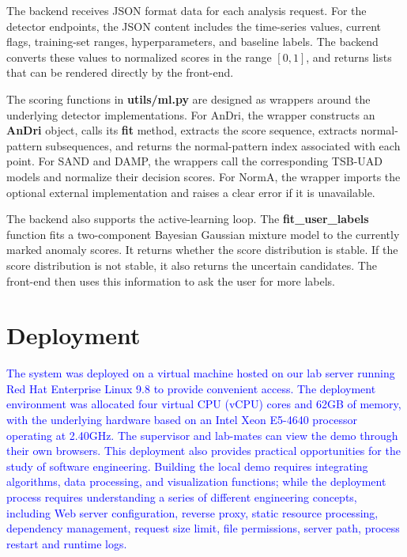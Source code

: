 The backend receives JSON format data for each analysis request. For the detector endpoints, the JSON content includes the time-series values, current flags, training-set ranges, hyperparameters, and baseline labels. The backend converts these values to normalized scores in the range \([0,1]\), and returns lists that can be rendered directly by the front-end.

The scoring functions in \textbf{utils/ml.py} are designed as wrappers around the underlying detector implementations. For AnDri, the wrapper constructs an \textbf{AnDri} object, calls its \textbf{fit} method, extracts the score sequence, extracts normal-pattern subsequences, and returns the normal-pattern index associated with each point. For SAND and DAMP, the wrappers call the corresponding TSB-UAD models and normalize their decision scores. For NormA, the wrapper imports the optional external implementation and raises a clear error if it is unavailable.

The backend also supports the active-learning loop. The \textbf{fit\_user\_labels} function fits a two-component Bayesian Gaussian mixture model to the currently marked anomaly scores. It returns whether the score distribution is stable. If the score distribution is not stable, it also returns the uncertain candidates. The front-end then uses this information to ask the user for more labels. 


\section{Deployment}
\label{sec:D}

\textcolor{blue}{The system was deployed on a virtual machine hosted on our lab server running Red Hat Enterprise Linux 9.8 to provide convenient access. The deployment environment was allocated four virtual CPU (vCPU) cores and 62GB of memory, with the underlying hardware based on an Intel Xeon E5-4640 processor operating at 2.40GHz. The supervisor and lab-mates can view the demo through their own browsers. This deployment also provides practical opportunities for the study of software engineering. Building the local demo requires integrating algorithms, data processing, and visualization functions; while the deployment process requires understanding a series of different engineering concepts, including Web server configuration, reverse proxy, static resource processing, dependency management, request size limit, file permissions, server path, process restart and runtime logs.}

